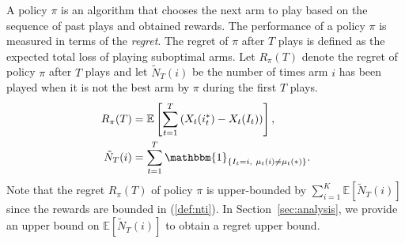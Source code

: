\documentclass[letterpaper]{article} %
\begin{document}
A policy $\pi$ is an algorithm that chooses the next arm to play based on the sequence of past plays and obtained rewards. The performance of a policy $\pi$ is measured in terms of the \emph{regret}. The regret of $\pi$ after $T$ plays is defined as the expected total loss of playing suboptimal arms. Let $R_\pi(T)$ denote the regret of policy $\pi$ after $T$ plays and let $\tilde{N}_T(i)$ be the number of times arm $i$ has been played when it is not the best arm by $\pi$ during the first $T$ plays.
\begin{align}\label{def:nti}
R_\pi(T)&=\mathbb{E}\left[\sum_{t=1}^T\left(X_t(i^*_t)-X_t(I_t)\right)\right],\\
\tilde{N}_T(i)&=\sum_{t=1}^T\mathbbm{1}_{\left\{I_t=i,~\mu_t(i)\neq \mu_t(*)\right\}}.
\end{align}
Note that the regret $R_\pi(T)$ of policy $\pi$ is upper-bounded by $\sum_{i=1}^K\mathbb{E}[\tilde{N}_T(i)]$ since the rewards are bounded in (\ref{def:nti}).
In Section~\ref{sec:analysis}, we provide an upper bound on $\mathbb{E}[\tilde{N}_T(i)]$ to obtain a regret upper bound.

\end{document}
